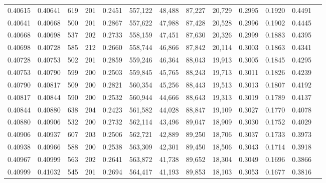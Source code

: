 \begin{tabular}{rrrrrrrrrrrrr}
0.40615 & 0.40641 &   619 & 201 &                                     0.2451 & 557,122 &  48,488 &  87,227 &  20,729 & 0.2995 & 0.1920 & 0.4491 \\
0.40641 & 0.40668 &   500 & 201 &                                     0.2867 & 557,622 &  47,988 &  87,428 &  20,528 & 0.2996 & 0.1902 & 0.4445 \\
0.40668 & 0.40698 &   537 & 202 &                                     0.2733 & 558,159 &  47,451 &  87,630 &  20,326 & 0.2999 & 0.1883 & 0.4395 \\
0.40698 & 0.40728 &   585 & 212 &                                     0.2660 & 558,744 &  46,866 &  87,842 &  20,114 & 0.3003 & 0.1863 & 0.4341 \\
0.40728 & 0.40753 &   502 & 201 &                                     0.2859 & 559,246 &  46,364 &  88,043 &  19,913 & 0.3005 & 0.1845 & 0.4295 \\
0.40753 & 0.40790 &   599 & 200 &                                     0.2503 & 559,845 &  45,765 &  88,243 &  19,713 & 0.3011 & 0.1826 & 0.4239 \\
0.40790 & 0.40817 &   509 & 200 &                                     0.2821 & 560,354 &  45,256 &  88,443 &  19,513 & 0.3013 & 0.1807 & 0.4192 \\
0.40817 & 0.40844 &   590 & 200 &                                     0.2532 & 560,944 &  44,666 &  88,643 &  19,313 & 0.3019 & 0.1789 & 0.4137 \\
0.40844 & 0.40880 &   638 & 204 &                                     0.2423 & 561,582 &  44,028 &  88,847 &  19,109 & 0.3027 & 0.1770 & 0.4078 \\
0.40880 & 0.40906 &   532 & 200 &                                     0.2732 & 562,114 &  43,496 &  89,047 &  18,909 & 0.3030 & 0.1752 & 0.4029 \\
0.40906 & 0.40937 &   607 & 203 &                                     0.2506 & 562,721 &  42,889 &  89,250 &  18,706 & 0.3037 & 0.1733 & 0.3973 \\
0.40938 & 0.40966 &   588 & 200 &                                     0.2538 & 563,309 &  42,301 &  89,450 &  18,506 & 0.3043 & 0.1714 & 0.3918 \\
0.40967 & 0.40999 &   563 & 202 &                                     0.2641 & 563,872 &  41,738 &  89,652 &  18,304 & 0.3049 & 0.1696 & 0.3866 \\
0.40999 & 0.41032 &   545 & 201 &                                     0.2694 & 564,417 &  41,193 &  89,853 &  18,103 & 0.3053 & 0.1677 & 0.3816 \\

\end{tabular}
